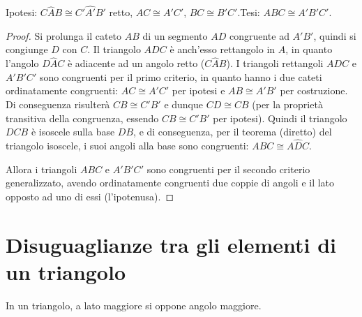 \noindent Ipotesi: \(C\widehat{A}B\cong C'\widehat{A'}B'\) retto, 
\(AC\cong A'C'\), \(BC\cong B'C'\).\tab\tab Tesi: \(ABC\cong A'B'C'\).


\begin{inaccessibleblock}
 \begin{figure}[htb]
\centering
\end{figure}
\end{inaccessibleblock}

\begin{proof}
Si prolunga il cateto \(AB\) di un segmento \(AD\) congruente ad \(A'B'\), 
quindi si congiunge \(D\) con \(C\). Il triangolo \(ADC\) è anch'esso 
rettangolo in \(A\), in quanto l'angolo \(D\widehat{A}C\) è adiacente ad 
un angolo retto (\(C\widehat{A}B\)). I triangoli rettangoli \(ADC\) e 
\(A'B'C'\) sono congruenti per il primo criterio, in quanto hanno i due 
cateti ordinatamente congruenti: \(AC\cong A'C'\) per ipotesi e 
\(AB\cong A'B'\) per costruzione. Di conseguenza risulterà \(CB\cong 
C'B'\) e dunque \(CD\cong CB\) (per la proprietà transitiva della 
congruenza, essendo \(CB\cong C'B'\) per ipotesi). Quindi il triangolo 
\(DCB\) è isoscele sulla base \(DB\), e di conseguenza, per il teorema 
(diretto) del triangolo isoscele, i suoi angoli alla base sono 
congruenti: \(A\widehat{B}C\cong A\widehat{D}C\).

Allora i triangoli \(ABC\) e \(A'B'C'\) sono congruenti per il secondo 
criterio generalizzato, avendo ordinatamente congruenti due coppie di 
angoli e il lato opposto ad uno di essi (l'ipotenusa).
\end{proof}

\section{Disuguaglianze tra gli elementi di un 
triangolo}\label{sect:disuguaglianze_triangoli}

\begin{teorema}
In un triangolo, a lato maggiore si oppone angolo maggiore.
\end{teorema}

